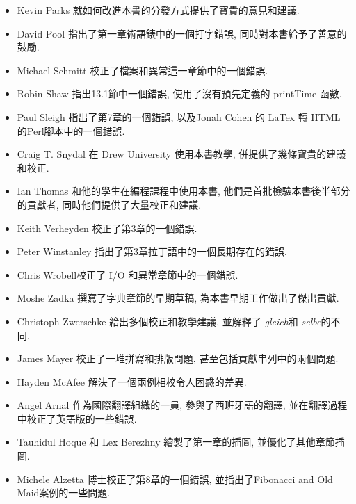 \documentclass[10pt]{book}
\begin{document}
\begin{itemize}
\item Kevin Parks 就如何改進本書的分發方式提供了寶貴的意見和建議. 

\item David Pool 指出了第一章術語錶中的一個打字錯誤, 同時對本書給予了善意的鼓勵. 

\item Michael Schmitt 校正了檔案和異常這一章節中的一個錯誤. 

\item Robin Shaw 指出13.1節中一個錯誤, 使用了沒有預先定義的 printTime 函數.  

\item Paul Sleigh 指出了第7章的一個錯誤, 
以及Jonah Cohen 的 LaTex 轉 HTML 的Perl腳本中的一個錯誤. 

\item Craig T. Snydal 在 Drew University 使用本書教學, 
併提供了幾條寶貴的建議和校正. 

\item Ian Thomas 和他的學生在編程課程中使用本書, 
他們是首批檢驗本書後半部分的貢獻者, 同時他們提供了大量校正和建議. 

\item Keith Verheyden 校正了第3章的一個錯誤. 

\item Peter Winstanley 指出了第3章拉丁語中的一個長期存在的錯誤. 

\item Chris Wrobell校正了 I/O 和異常章節中的一個錯誤. 

\item Moshe Zadka 撰寫了字典章節的早期草稿, 為本書早期工作做出了傑出貢獻. 

\item Christoph Zwerschke 給出多個校正和教學建議, 並解釋了
 {\em gleich}和 {\em selbe}的不同. 

\item James Mayer 校正了一堆拼寫和排版問題, 甚至包括貢獻串列中的兩個問題. 

\item Hayden McAfee 解決了一個兩例相校令人困惑的差異. 

\item Angel Arnal 作為國際翻譯組織的一員, 參與了西班牙語的翻譯, 
並在翻譯過程中校正了英語版的一些錯誤. 

\item Tauhidul Hoque 和 Lex Berezhny 繪製了第一章的插圖, 並優化了其他章節插圖. 

\item Michele Alzetta 博士校正了第8章的一個錯誤, 
並指出了Fibonacci and Old Maid案例的一些問題. 


\end{itemize}
\end{document}
